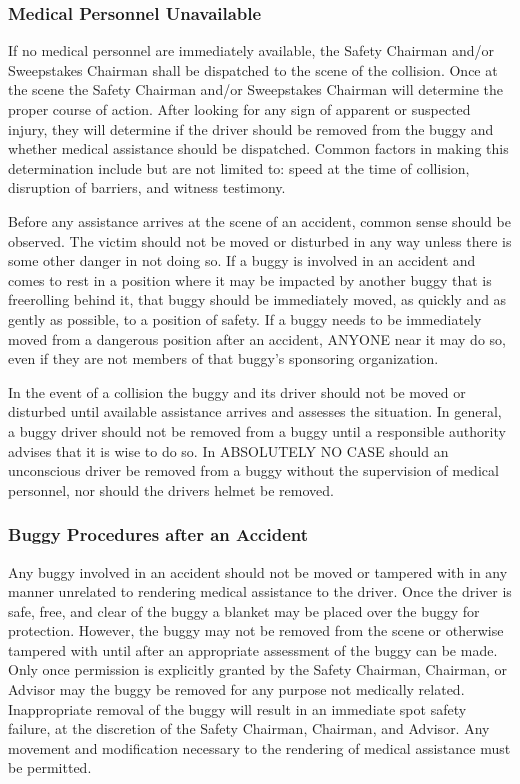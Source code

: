 	\subsubsection{Medical Personnel Unavailable}
	If no medical personnel are immediately available, the Safety Chairman and/or Sweepstakes Chairman shall be dispatched to the scene of the collision. Once at the scene the Safety Chairman and/or Sweepstakes Chairman will determine the proper course of action. After looking for any sign of apparent or suspected injury, they will determine if the driver should be removed from the buggy and whether medical assistance should be dispatched. Common factors in making this determination include but are not limited to: speed at the time of collision, disruption of barriers, and witness testimony.

	Before any assistance arrives at the scene of an accident, common sense should be observed. The victim should not be moved or disturbed in any way unless there is some other danger in not doing so. If a buggy is involved in an accident and comes to rest in a position where it may be impacted by another buggy that is freerolling behind it, that buggy should be immediately moved, as quickly and as gently as possible, to a position of safety. If a buggy needs to be immediately moved from a dangerous position after an accident, ANYONE near it may do so, even if they are not members of that buggy's sponsoring organization.

	In the event of a collision the buggy and its driver should not be moved or disturbed until available assistance arrives and assesses the situation. In general, a buggy driver should not be removed from a buggy until a responsible authority advises that it is wise to do so. In ABSOLUTELY NO CASE should an unconscious driver be removed from a buggy without the supervision of medical personnel, nor should the drivers helmet be removed.

	\subsubsection{Buggy Procedures after an Accident}
	Any buggy involved in an accident should not be moved or tampered with in any manner unrelated to rendering medical assistance to the driver. Once the driver is safe, free, and clear of the buggy a blanket may be placed over the buggy for protection. However, the buggy may not be removed from the scene or otherwise tampered with until after an appropriate assessment of the buggy can be made. Only once permission is explicitly granted by the Safety Chairman, Chairman, or Advisor may the buggy be removed for any purpose not medically related. Inappropriate removal of the buggy will result in an immediate spot safety failure, at the discretion of the Safety Chairman, Chairman, and Advisor. Any movement and modification necessary to the rendering of medical assistance must be permitted.
	
